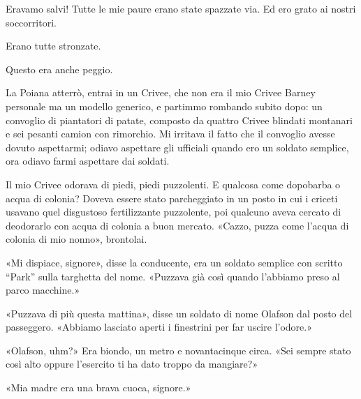 Eravamo salvi! Tutte le mie paure erano state spazzate via. Ed ero grato
ai nostri soccorritori.

Erano tutte stronzate.

Questo era anche peggio.

\hfill\break

La Poiana atterrò, entrai in un Crivee, che non era il mio Crivee Barney
personale ma un modello generico, e partimmo rombando subito dopo: un
convoglio di piantatori di patate, composto da quattro Crivee blindati
montanari e sei pesanti camion con rimorchio. Mi irritava il fatto che
il convoglio avesse dovuto aspettarmi; odiavo aspettare gli ufficiali
quando ero un soldato semplice, ora odiavo farmi aspettare dai soldati.

Il mio Crivee odorava di piedi, piedi puzzolenti. E qualcosa come
dopobarba o acqua di colonia? Doveva essere stato parcheggiato in un
posto in cui i criceti usavano quel disgustoso fertilizzante puzzolente,
poi qualcuno aveva cercato di deodorarlo con acqua di colonia a buon
mercato. «Cazzo, puzza come l'acqua di colonia di mio nonno», brontolai.

«Mi dispiace, signore», disse la conducente, era un soldato semplice con
scritto ``Park'' sulla targhetta del nome. «Puzzava già così quando
l'abbiamo preso al parco macchine.»

«Puzzava di più questa mattina», disse un soldato di nome Olafson dal
posto del passeggero. «Abbiamo lasciato aperti i finestrini per far
uscire l'odore.»

«Olafson, uhm?» Era biondo, un metro e novantacinque circa. «Sei sempre
stato così alto oppure l'esercito ti ha dato troppo da mangiare?»

«Mia madre era una brava cuoca, signore.»

